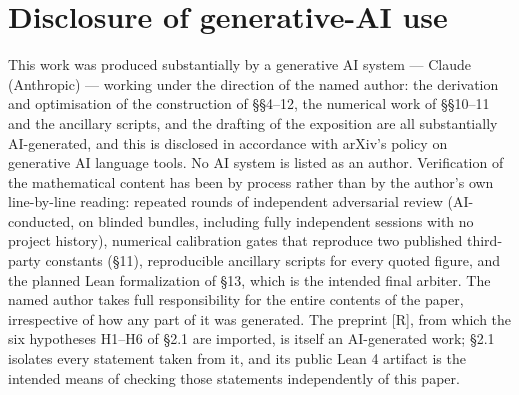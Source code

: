 \documentclass[11pt]{amsart}
\theoremstyle{plain}
\theoremstyle{remark}
\begin{document}
\section*{Disclosure of generative-AI use}

This work was produced substantially by a generative AI system --- Claude (Anthropic)
--- working under the direction of the named author: the derivation and optimisation
of the construction of \S\S4--12, the numerical work of \S\S10--11 and the ancillary
scripts, and the drafting of the exposition are all substantially AI-generated, and
this is disclosed in accordance with arXiv's policy on generative AI language tools.
No AI system is listed as an author. Verification of the mathematical content has
been by process rather than by the author's own line-by-line reading: repeated
rounds of independent adversarial review (AI-conducted, on blinded bundles,
including fully independent sessions with no project history), numerical
calibration gates that reproduce two published third-party constants (\S11),
reproducible ancillary scripts for every quoted figure, and the planned Lean
formalization of \S13, which is the intended final arbiter. The named author takes
full responsibility for the entire contents of the paper, irrespective of how any
part of it was generated. The preprint [R], from which the six hypotheses H1--H6 of
\S2.1 are imported, is itself an AI-generated work; \S2.1 isolates every statement
taken from it, and its public Lean 4 artifact is the intended means of checking those
statements independently of this paper.
\end{document}
